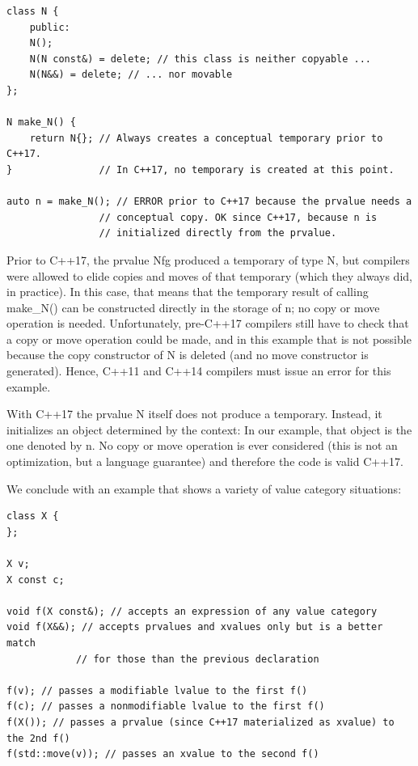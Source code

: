 \begin{lstlisting}[style=styleCXX]
class N {
	public:
	N();
	N(N const&) = delete; // this class is neither copyable ...
	N(N&&) = delete; // ... nor movable
};

N make_N() {
	return N{}; // Always creates a conceptual temporary prior to C++17.
} 				// In C++17, no temporary is created at this point.

auto n = make_N(); // ERROR prior to C++17 because the prvalue needs a
				// conceptual copy. OK since C++17, because n is
				// initialized directly from the prvalue.
\end{lstlisting}

Prior to C++17, the prvalue Nfg produced a temporary of type N, but compilers were allowed to elide copies and moves of that temporary (which they always did, in practice). In this case, that means that the temporary result of calling make\_N() can be constructed directly in the storage of n; no copy or move operation is needed. Unfortunately, pre-C++17 compilers still have to check that a copy or move operation could be made, and in this example that is not possible because the copy constructor of N is deleted (and no move constructor is generated). Hence, C++11 and C++14 compilers must issue an error for this example.

With C++17 the prvalue N itself does not produce a temporary. Instead, it initializes an object determined by the context: In our example, that object is the one denoted by n. No copy or move operation is ever considered (this is not an optimization, but a language guarantee) and therefore the code is valid C++17.

We conclude with an example that shows a variety of value category situations:

\begin{lstlisting}[style=styleCXX]
class X {
};

X v;
X const c;

void f(X const&); // accepts an expression of any value category
void f(X&&); // accepts prvalues and xvalues only but is a better match
			// for those than the previous declaration

f(v); // passes a modifiable lvalue to the first f()
f(c); // passes a nonmodifiable lvalue to the first f()
f(X()); // passes a prvalue (since C++17 materialized as xvalue) to the 2nd f()
f(std::move(v)); // passes an xvalue to the second f()
\end{lstlisting}









